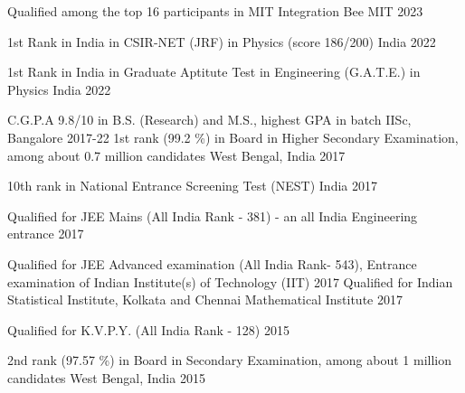 




\begin{cvhonors}

 \cvhonor
{} %
{Qualified among the top 16 participants in MIT Integration Bee} %
{MIT} %
{2023} %

 \cvhonor
{1st Rank in India} %
{in CSIR-NET (JRF) in Physics (score 186/200)} %
{India} %
{2022} %

 \cvhonor
{1st Rank in India} %
{in Graduate Aptitute Test in Engineering (G.A.T.E.) in Physics} %
{India} %
{2022} %

  \cvhonor
{C.G.P.A} %
{9.8/10 in B.S. (Research) and M.S., highest GPA in batch} %
{IISc, Bangalore} %
{2017-22} %
  \cvhonor
    {1st rank (99.2 \%) in Board} %
    {in Higher Secondary Examination, among about 0.7 million candidates} %
    {West Bengal, India} %
    {2017} %

  \cvhonor
    {} %
    {10th rank in National Entrance Screening Test (NEST)} %
    {India} %
    {2017} %

  \cvhonor
	{} %
	{Qualified for JEE Mains (All India Rank - 381) - an all India Engineering entrance} %
	{} %
	{2017} %
	 
	\cvhonor
	{} %
	{Qualified for JEE Advanced examination (All India Rank- 543), Entrance examination of Indian Institute(s) of Technology (IIT)} %
	{} %
	{2017} %
  \cvhonor
    {} %
    {Qualified for Indian Statistical Institute, Kolkata and Chennai Mathematical Institute} %
    {} %
    {2017} %

  \cvhonor
    {} %
    {Qualified for K.V.P.Y. (All India Rank - 128)} %
    {} %
    {2015} %

  \cvhonor
    {2nd rank (97.57 \%) in Board} %
    {in Secondary Examination, among about 1 million candidates} %
    {West Bengal, India} %
    {2015} %

\end{cvhonors}


